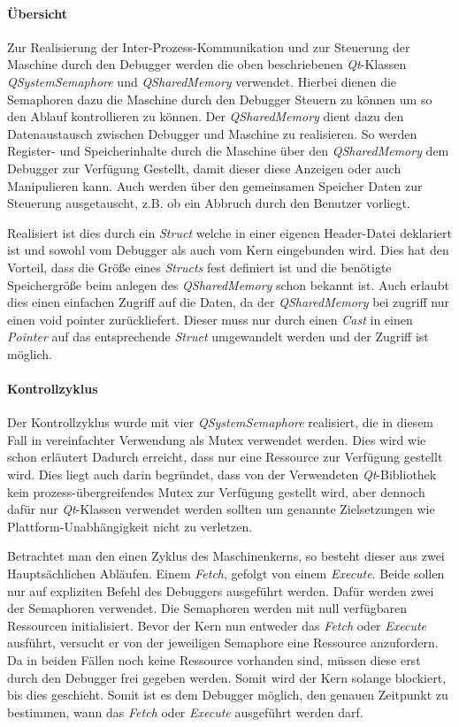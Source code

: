 \paragraph{Übersicht}
Zur Realisierung der Inter-Prozess-Kommunikation und zur Steuerung der Maschine durch den Debugger werden die oben beschriebenen \emph{Qt}-Klassen \emph{QSystemSemaphore} und \emph{QSharedMemory} verwendet. Hierbei dienen die Semaphoren dazu die Maschine durch den Debugger Steuern zu können um so den Ablauf kontrollieren zu können. Der \emph{QSharedMemory} dient dazu den Datenaustausch zwischen Debugger und Maschine zu realisieren. So werden Register- und Speicherinhalte durch die Maschine über den \emph{QSharedMemory} dem Debugger zur Verfügung Gestellt, damit dieser diese Anzeigen oder auch Manipulieren kann. Auch werden über den gemeinsamen Speicher Daten zur Steuerung ausgetauscht, z.B. ob ein Abbruch durch den Benutzer vorliegt.

Realisiert ist dies durch ein \emph{Struct} welche in einer eigenen Header-Datei deklariert ist und sowohl vom Debugger als auch vom Kern eingebunden wird. Dies hat den Vorteil, dass die Größe eines \emph{Structs} fest definiert ist und die benötigte Speichergröße beim anlegen des \emph{QSharedMemory} schon bekannt ist. Auch erlaubt dies einen einfachen Zugriff auf die Daten, da der \emph{QSharedMemory} bei zugriff nur einen void pointer zurückliefert. Dieser muss nur durch einen \emph{Cast} in einen \emph{Pointer} auf das entsprechende \emph{Struct} umgewandelt werden und der Zugriff ist möglich.


\paragraph{Kontrollzyklus}
Der Kontrollzyklus wurde mit vier \emph{QSystemSemaphore} realisiert, die in diesem Fall in vereinfachter Verwendung als Mutex verwendet werden. Dies wird wie schon erläutert Dadurch erreicht, dass nur eine Ressource zur Verfügung gestellt wird. Dies liegt auch darin begründet, dass von der Verwendeten \emph{Qt}-Bibliothek kein prozess-übergreifendes Mutex zur Verfügung gestellt wird, aber dennoch dafür nur \emph{Qt}-Klassen verwendet werden sollten um genannte Zielsetzungen wie Plattform-Unabhängigkeit nicht zu verletzen.

Betrachtet man den einen Zyklus des Maschinenkerns, so besteht dieser aus zwei Hauptsächlichen Abläufen. Einem \emph{Fetch}, gefolgt von einem \emph{Execute}. Beide sollen nur auf expliziten Befehl des Debuggers ausgeführt werden. Dafür werden zwei der Semaphoren verwendet. Die Semaphoren werden mit null verfügbaren Ressourcen initialisiert. Bevor der Kern nun entweder das \emph{Fetch} oder \emph{Execute} ausführt, versucht er von der jeweiligen Semaphore eine Ressource anzufordern. Da in beiden Fällen noch keine Ressource vorhanden sind, müssen diese erst durch den Debugger frei gegeben werden. Somit wird der Kern solange blockiert, bis dies geschieht. Somit ist es dem Debugger möglich, den genauen Zeitpunkt zu bestimmen, wann das \emph{Fetch} oder \emph{Execute} ausgeführt werden darf.

